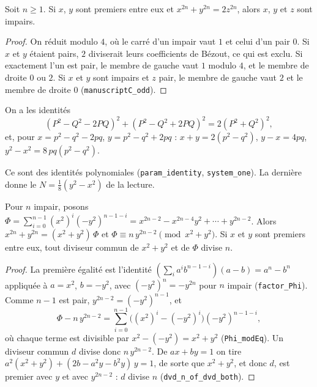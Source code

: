 \begin{enonce}
Soit $n \geq 1$. Si $x$, $y$ sont premiers entre eux et $x^{2n} + y^{2n} = 2z^{2n}$, alors $x$, $y$ et $z$ sont impairs.
\end{enonce}

\begin{proof}
On réduit modulo $4$, où le carré d'un impair vaut $1$ et celui d'un pair $0$. Si $x$ et $y$ étaient pairs, $2$ diviserait leurs coefficients de Bézout, ce qui est exclu. Si exactement l'un est pair, le membre de gauche vaut $1$ modulo $4$, et le membre de droite $0$ ou $2$. Si $x$ et $y$ sont impairs et $z$ pair, le membre de gauche vaut $2$ et le membre de droite $0$ (\texttt{manuscriptC\_odd}).
\end{proof}

\begin{enonce}
On a les identités
\[ (P^2-Q^2-2PQ)^2 + (P^2-Q^2+2PQ)^2 = 2(P^2+Q^2)^2, \]
et, pour $x = p^2-q^2-2pq$, $y = p^2-q^2+2pq$ : $x + y = 2(p^2-q^2)$, $y - x = 4pq$, $y^2 - x^2 = 8\,pq(p^2-q^2)$.
\end{enonce}

Ce sont des identités polynomiales (\texttt{param\_identity}, \texttt{system\_one}). La dernière donne le $N = \tfrac18(y^2-x^2)$ de la lecture.

\begin{enonce}
Pour $n$ impair, posons $\Phi = \sum_{i=0}^{n-1} (x^2)^i (-y^2)^{n-1-i} = x^{2n-2} - x^{2n-4}y^2 + \cdots + y^{2n-2}$. Alors $x^{2n} + y^{2n} = (x^2+y^2)\,\Phi$ et $\Phi \equiv n\,y^{2n-2} \pmod{x^2+y^2}$. Si $x$ et $y$ sont premiers entre eux, tout diviseur commun de $x^2+y^2$ et de $\Phi$ divise $n$.
\end{enonce}

\begin{proof}
La première égalité est l'identité $(\sum_i a^i b^{n-1-i})(a-b) = a^n - b^n$ appliquée à $a = x^2$, $b = -y^2$, avec $(-y^2)^n = -y^{2n}$ pour $n$ impair (\texttt{factor\_Phi}). Comme $n-1$ est pair, $y^{2n-2} = (-y^2)^{n-1}$, et
\[ \Phi - n\,y^{2n-2} = \sum_{i=0}^{n-1} \bigl((x^2)^i - (-y^2)^i\bigr)(-y^2)^{n-1-i}, \]
où chaque terme est divisible par $x^2 - (-y^2) = x^2+y^2$ (\texttt{Phi\_modEq}). Un diviseur commun $d$ divise donc $n\,y^{2n-2}$. De $ax + by = 1$ on tire $a^2(x^2+y^2) + (2b - a^2y - b^2y)\,y = 1$, de sorte que $x^2+y^2$, et donc $d$, est premier avec $y$ et avec $y^{2n-2}$ : $d$ divise $n$ (\texttt{dvd\_n\_of\_dvd\_both}).
\end{proof}

